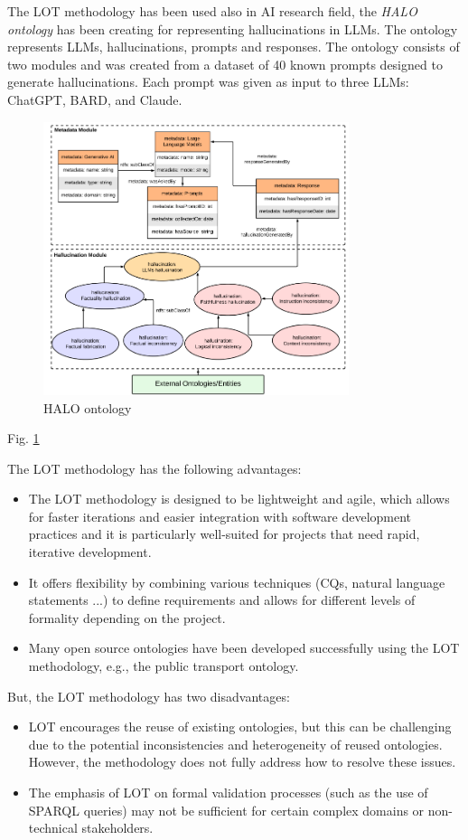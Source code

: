 The LOT methodology has been used also in AI research field, the \textit{HALO ontology} \cite{nananukul2024halo} has been creating for representing hallucinations in LLMs.
The ontology represents LLMs, hallucinations, prompts and responses.
The ontology consists of two modules and was created from a dataset of 40 known prompts designed to generate hallucinations.
Each prompt was given as input to three LLMs: ChatGPT, BARD, and Claude.
\begin{figure}[H]
    \centering
    \includegraphics[width=0.7\linewidth, height=8cm]{Figures/fig_4.png}
    \caption{HALO ontology}
    \label{fig:halo}
\end{figure}
Fig. \ref{fig:halo}

The LOT methodology has the following advantages:
\begin{itemize}
    \item The LOT methodology is designed to be lightweight and agile, which allows for faster iterations and easier integration with software development practices and it is particularly well-suited for projects that need rapid, iterative development.

    \item It offers flexibility by combining various techniques (CQs, natural language statements ...) to define requirements and allows for different levels of formality depending on the project.

    \item Many open source ontologies have been developed successfully using the LOT methodology, e.g., the public transport ontology.
\end{itemize}
But, the LOT methodology has two disadvantages:
\begin{itemize}
    \item LOT encourages the reuse of existing ontologies, but this can be challenging due to the potential inconsistencies and heterogeneity of reused ontologies. However, the methodology does not fully address how to resolve these issues.

    \item The emphasis of LOT on formal validation processes (such as the use of SPARQL queries) may not be sufficient for certain complex domains or non-technical stakeholders.
\end{itemize}

